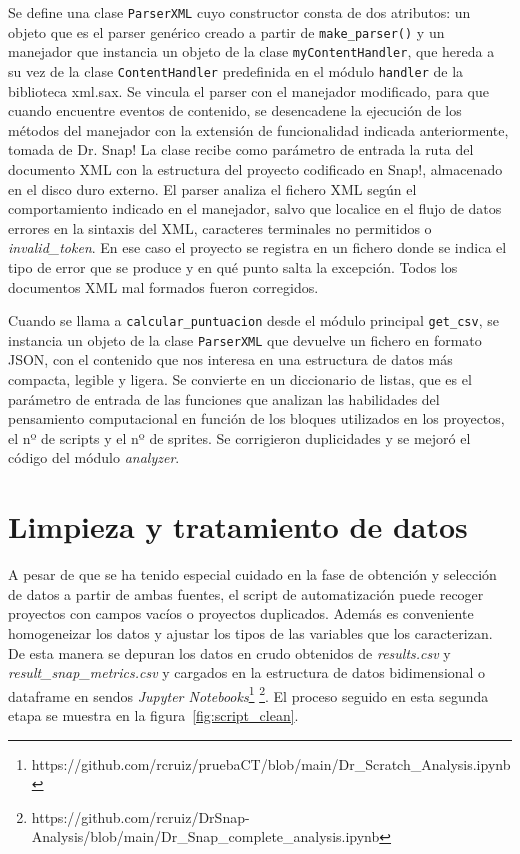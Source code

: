 \documentclass[a4paper, 12pt]{book}
\begin{document}
Se define una clase \texttt{ParserXML} cuyo constructor consta de dos atributos: un objeto que es el parser genérico creado a partir de \texttt{make\_parser()} y un manejador que instancia un objeto de la clase \texttt{myContentHandler}, que hereda a su vez de la clase \texttt{ContentHandler} predefinida en el módulo \texttt{handler} de la biblioteca xml.sax. Se vincula el parser con el manejador modificado, para que cuando encuentre eventos de contenido, se desencadene la ejecución de los métodos del manejador con la extensión de funcionalidad indicada anteriormente, tomada de Dr. Snap! La clase recibe como parámetro de entrada la ruta del documento XML con la estructura del proyecto codificado en Snap!, almacenado en el disco duro externo. El parser analiza el fichero XML según el comportamiento indicado en el manejador, salvo que localice en el flujo de datos errores en la sintaxis del XML, caracteres terminales no permitidos o \emph{invalid\_token}. En ese caso el proyecto se registra en un fichero donde se indica el tipo de error que se produce y en qué punto salta la excepción. Todos los documentos XML mal formados fueron corregidos. 

Cuando se llama a \texttt{calcular\_puntuacion} desde el módulo principal \texttt{get\_csv}, se instancia un objeto de la clase \texttt{ParserXML} que devuelve un fichero en formato JSON, con el contenido que nos interesa en una estructura de datos más compacta, legible y ligera. Se convierte en un diccionario de listas, que es el parámetro de entrada de las funciones que analizan las habilidades del pensamiento computacional en función de los bloques utilizados en los proyectos, el nº de scripts y el nº de sprites. Se corrigieron duplicidades y se mejoró el código del módulo \emph{analyzer}.

\section{Limpieza y tratamiento de datos} 
\label{sec:clean_data}

A pesar de que se ha tenido especial cuidado en la fase de obtención y selección de datos a partir de ambas fuentes, el script de automatización puede recoger proyectos con campos vacíos o proyectos duplicados. Además es conveniente homogeneizar los datos y ajustar los tipos de las variables que los caracterizan. De esta manera se depuran los datos en crudo obtenidos de \emph{results.csv} y \emph{result\_snap\_metrics.csv} y cargados en la estructura de datos bidimensional o dataframe en sendos \emph{Jupyter Notebooks}\footnote{https://github.com/rcruiz/pruebaCT/blob/main/Dr\_Scratch\_Analysis.ipynb} \footnote{https://github.com/rcruiz/DrSnap-Analysis/blob/main/Dr\_Snap\_complete\_analysis.ipynb}. El proceso seguido en esta segunda etapa se muestra en la figura~\ref{fig:script_clean}. 
\end{document}
